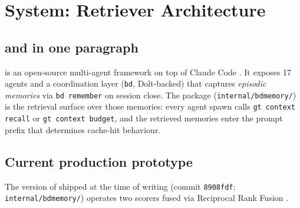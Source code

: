 \section{System: \blackrim Retriever Architecture}
\label{sec:system}


\subsection{\blackrim and \bdmemory in one paragraph}

\blackrim \cite{german2026blackrim} is an open-source multi-agent
framework on top of Claude Code \cite{anthropic2024claudecode}. It
exposes 17 agents and a coordination layer (\texttt{bd}, Dolt-backed)
that captures \emph{episodic memories} via \texttt{bd remember} on
session close. The \bdmemory package
(\texttt{internal/bdmemory/}) is the retrieval surface over those
memories: every agent spawn calls \texttt{gt context recall} or
\texttt{gt context budget}, and the retrieved memories enter the
prompt prefix that determines cache-hit behaviour.

\subsection{Current production prototype}
\label{sec:system-prototype}

The version of \bdmemory shipped at the time of writing
(commit \texttt{8908fdf}; \texttt{internal/bdmemory/}) operates
two scorers fused via Reciprocal Rank Fusion
\cite{cormack2009reciprocal}.

